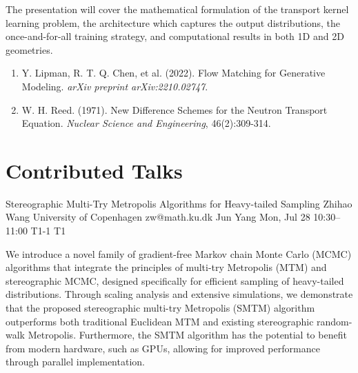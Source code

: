 \documentclass[12pt,lettersize,oneside]{book} %
\begin{document}
\begin{talk}
The presentation will cover the mathematical formulation of the transport kernel learning problem, the architecture which captures the output distributions, the once-and-for-all training strategy, and computational  results in both 1D and 2D geometries.


\medskip
\begin{enumerate} 
\item[{[1]}] Y. Lipman, R. T. Q. Chen, et al. (2022). Flow Matching for Generative Modeling. {\it arXiv preprint arXiv:2210.02747}. 
\item[{[2]}] W. H. Reed. (1971). New Difference Schemes for the Neutron Transport Equation. {\it Nuclear Science and Engineering}, 46(2):309-314. 
\end{enumerate}

\end{talk}





\section{Contributed Talks}

\begin{talk}
  {Stereographic Multi-Try Metropolis Algorithms for Heavy-tailed Sampling}%
  {Zhihao Wang}%
  {University of Copenhagen}%
  {zw@math.ku.dk}%
  {Jun Yang}%
  {}%
  {Mon, Jul 28 10:30--11:00}%
  {T1-1}%
  {T1}%
  
    
   
We introduce a novel family of gradient-free Markov chain Monte Carlo (MCMC) algorithms that integrate the principles of multi-try Metropolis (MTM) and stereographic MCMC, designed specifically for efficient sampling of heavy-tailed distributions. Through scaling analysis and extensive simulations, we demonstrate that the proposed stereographic multi-try Metropolis (SMTM) algorithm outperforms both traditional Euclidean MTM and existing stereographic random-walk Metropolis. Furthermore, the SMTM algorithm has the potential to benefit from modern hardware, such as GPUs, allowing for improved performance through parallel implementation.
\end{talk}
\end{document}

